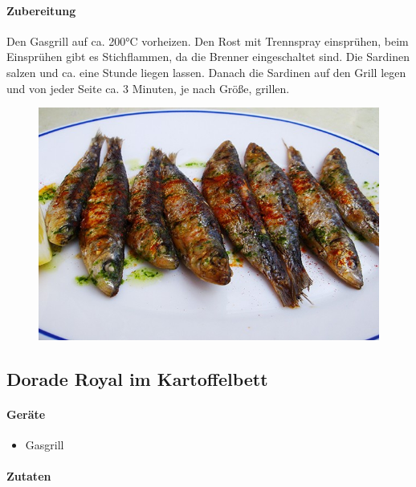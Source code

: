 \paragraph{Zubereitung}

Den Gasgrill auf ca. 200°C vorheizen. Den Rost mit Trennspray einsprühen,  beim Einsprühen gibt es Stichflammen, da die Brenner eingeschaltet sind. Die Sardinen salzen und ca. eine Stunde liegen lassen. Danach die Sardinen auf den Grill legen und von jeder Seite ca. 3 Minuten, je nach Größe,  grillen. 

\begin{figure}[htbp]
	\centering
	\begin{minipage}{1\textwidth}
		\centering
		\includegraphics[width=.9\linewidth]{pics/Gegrillte_Sardinen}
		\label{fig:Gegrillte_Sardinen}
	\end{minipage}
\end{figure}
\newpage

\subsection{Dorade Royal im Kartoffelbett}

\paragraph{Geräte}

\begin{itemize}[noitemsep]
	\item Gasgrill
\end{itemize}

\paragraph{Zutaten}


